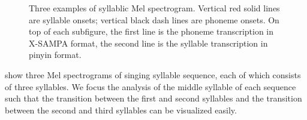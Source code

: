 \begin{figure}[ht!]
    \centering
    \hfill
    \hfill

  
    \caption[]{Three examples of syllablic Mel spectrogram. Vertical red solid lines are syllable onsets; vertical black dash lines are phoneme onsets. On top of each subfigure, the first line is the phoneme transcription in \gls{X-SAMPA} format, the second line is the syllable transcription in pinyin format.}
    \label{fig:ch4:task1_visualization}
\end{figure}

 show three Mel spectrograms of singing syllable sequence, each of which consists of three syllables. We focus the analysis of the middle syllable of each sequence such that the transition between the first and second syllables and the transition between the second and third syllables can be visualized easily. 

